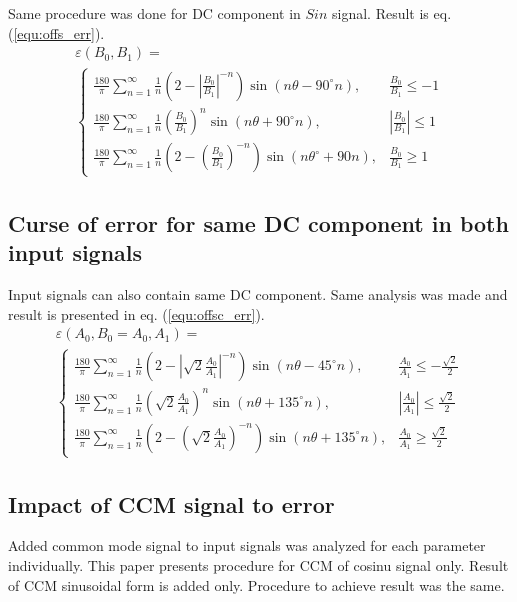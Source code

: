 \documentclass[a4paper]{article}
\begin{document}
Same procedure was done for DC component in $Sin$ signal. Result is eq. (\ref{equ:offs_err}).
\begin{multline}
\label{equ:offs_err}
\varepsilon(B_0, B_1)=\\
\begin{cases}
\frac{180}{\pi}\sum_{n=1}^{\infty}\frac{1}{n}(2-|\frac{B_0}{B_1}|^{-n}) \sin (n \theta -  90^\circ n), & \frac{B_0}{B_1}\leq -1 \\
\frac{180}{\pi}\sum_{n=1}^{\infty}\frac{1}{n}(\frac{B_0}{B_1})^n \sin (n \theta + 90^\circ n), & |\frac{B_0}{B_1}|\leq 1 \\
\frac{180}{\pi}\sum_{n=1}^{\infty}\frac{1}{n}(2-(\frac{B_0}{B_1})^{-n}) \sin (n \theta^\circ + 90 n), & \frac{B_0}{B_1}\geq 1
\end{cases}
\end{multline}

\subsection{Curse of error for same DC component in both input signals}
Input signals can also contain same DC component. Same analysis was made and result is presented in eq. (\ref{equ:offsc_err}).
\begin{multline}
\label{equ:offsc_err}
\varepsilon(A_0,B_0=A_0, A_1)=\\
\begin{cases}
\frac{180}{\pi}\sum_{n=1}^{\infty}\frac{1}{n}(2-|\sqrt{2}\frac{A_0}{A_1}|^{-n}) \sin (n \theta - 45^\circ n), & \frac{A_0}{A_1}\leq -\frac{\sqrt{2}}{2} \\
\frac{180}{\pi}\sum_{n=1}^{\infty}\frac{1}{n}(\sqrt{2}\frac{A_0}{A_1})^n \sin (n \theta + 135^\circ n), & |\frac{A_0}{A_1}|\leq \frac{\sqrt{2}}{2} \\
\frac{180}{\pi}\sum_{n=1}^{\infty}\frac{1}{n}(2-(\sqrt{2}\frac{A_0}{A_1})^{-n}) \sin (n \theta +135^\circ n), & \frac{A_0}{A_1}\geq \frac{\sqrt{2}}{2}
\end{cases}
\end{multline}

\subsection{Impact of CCM signal to error}

Added common mode signal to input signals was analyzed for each parameter individually. This paper presents procedure for CCM of cosinu signal only. Result of CCM sinusoidal form is added only. Procedure to achieve result was the same.
\end{document}
